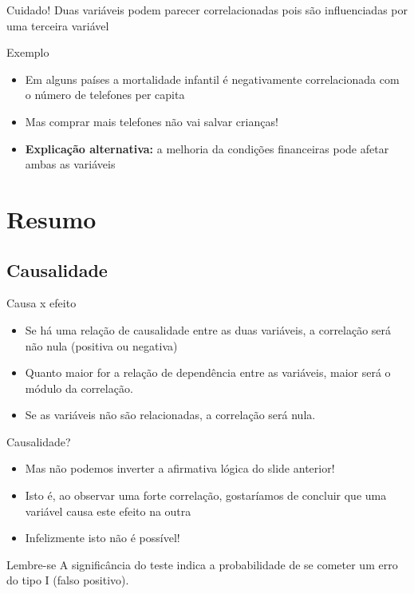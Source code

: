 \documentclass{beamer}
\begin{document}
\begin{frame}{\scriptsize }
  \begin{block}{Cuidado!}
    \footnotesize
    Duas variáveis podem \alert{parecer} correlacionadas pois são
    influenciadas por uma terceira variável
  \end{block}
  \begin{exampleblock}{Exemplo}
    \footnotesize
    \begin{itemize}
      \footnotesize
    \item Em alguns países a mortalidade infantil é negativamente
      correlacionada com o número de telefones per capita
    \item Mas comprar mais telefones não vai salvar crianças!
      \bigskip
    \item {\bf Explicação alternativa:} a melhoria da condições financeiras
      pode afetar ambas as variáveis
    \end{itemize}    
  \end{exampleblock}
\end{frame}

\section{Resumo}

\subsection{Causalidade}

\begin{frame}{\scriptsize Causa x efeito}
  \begin{itemize}
    \footnotesize
  \item Se há uma relação de causalidade entre as duas variáveis, a
    correlação será não nula (positiva ou negativa)
    \bigskip
  \item Quanto maior for a relação de dependência entre as variáveis,
    maior será o módulo da correlação.
    \bigskip
  \item Se as variáveis não são relacionadas, a correlação será nula.
  \end{itemize}
\end{frame}

\begin{frame}{\scriptsize Causalidade?}
  \begin{itemize}
    \footnotesize
  \item Mas não podemos inverter a afirmativa lógica do slide
    anterior!
    \bigskip
  \item Isto é, ao observar uma forte correlação, gostaríamos de
    concluir que uma variável \alert{causa} este efeito na outra
    \bigskip
  \item Infelizmente isto não é possível!
  \end{itemize}
  \vfill
  \begin{block}{Lembre-se}
    \scriptsize
    A significância do teste indica a probabilidade de se cometer um
    erro do tipo I (falso positivo).
  \end{block}
\end{frame}
\end{document}
